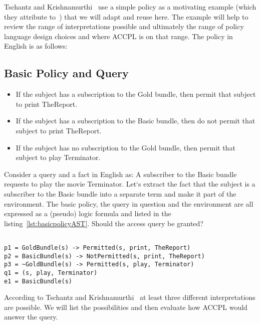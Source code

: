 Tschantz and Krishnamurthi~\cite{Tschantz} use a simple policy as a motivating example (which they attribute to~\cite{Halpern2008}) that we will adapt and reuse here. The example will help to review the range of interpretations possible and ultimately the range of policy language design choices and where \ac{ACCPL} is on that range.
The policy in English is as follows:
\subsection{Basic Policy and Query}\label{sec:basicpolicyenglish}
\begin{itemize}
\item If the subject has a subscription to the Gold bundle, then permit that subject to print TheReport.

\item If the subject has a subscription to the Basic bundle, then do not permit that subject to print TheReport.

\item If the subject has no subscription to the Gold bundle, then permit that subject to play Terminator.
\end{itemize}

Consider a query and a fact in English as: A subscriber to the Basic bundle requests to play the movie Terminator. Let`s extract the fact that the subject is a subscriber to the Basic bundle into a separate term and make it part of the environment. The basic policy, the query in question and the environment are all expressed as a (pseudo) logic formula and listed in the listing~\ref{lst:basicpolicyAST}. Should the access query be granted?

\lstset{mathescape, language=AST}  
\begin{lstlisting}[frame=single, caption={Basic Policy},label={lst:basicpolicyAST}]

p1 = GoldBundle(s) -> Permitted(s, print, TheReport) 
p2 = BasicBundle(s) -> NotPermitted(s, print, TheReport) 
p3 = ~GoldBundle(s) -> Permitted(s, play, Terminator)
q1 = (s, play, Terminator) 
e1 = BasicBundle(s)
\end{lstlisting}


According to Tschantz and Krishnamurthi~\cite{Tschantz} at least three different interpretations are possible. We will list the possibilities and then evaluate how \ac{ACCPL} would answer the query.

